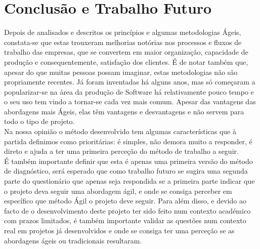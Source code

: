 \chapter{Conclusão e Trabalho Futuro}
\label{chp:conclusao}

Depois de analisados e descritos os princípios e algumas metodologias Ágeis, constata-se que estas trouxeram melhorias notórias nos processos e fluxos de trabalho das empresas, que se convertem em maior organização, capacidade de produção e consequentemente, satisfação dos clientes. É de notar também que, apesar do que muitas pessoas possam imaginar, estas metodologias não são propriamente recentes. Já foram inventadas há alguns anos, mas só começaram a popularizar-se na área da produção de Software há relativamente pouco tempo e o seu uso tem vindo a tornar-se cada vez mais comum. Apesar das vantagens das abordagens mais Ágeis, elas têm vantagens e desvantagens e não servem para todo o tipo de projeto.\\
Na nossa opinião o método desenvolvido tem algumas características que à partida definimos como prioritárias: é simples, não demora muito a responder, é direto e ajuda a ter uma primeira perceção do método de trabalho a seguir.\\
É também importante definir que esta é apenas uma primeira versão do método de diagnóstico, será esperado que como trabalho futuro se sugira uma segunda parte do questionário que apenas seja respondida se a primeira parte indicar que o projeto deva seguir uma abordagem ágil, e onde se consiga perceber em específico que método Ágil o projeto deve seguir. Para além disso, e devido ao facto de o desenvolvimento deste projeto ter sido feito num contexto académico com prazos limitados, é também importante validar as questões num contexto real em projetos já desenvolvidos e onde se consiga ter uma perceção se as abordagens ágeis ou tradicionais resultaram.
